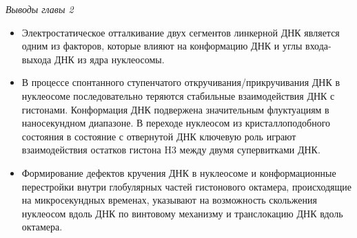 \textit{Выводы главы 2} \newline

 
\begin{itemize}
    \item Электростатическое отталкивание двух сегментов линкерной ДНК является одним из факторов, которые влияют на конформацию ДНК и углы входа-выхода ДНК из ядра нуклеосомы.
    \item В процессе спонтанного ступенчатого откручивания/прикручивания ДНК в нуклеосоме последовательно теряются стабильные взаимодействия ДНК с гистонами. Конформация ДНК подвержена значительным флуктуациям в наносекундном диапазоне. В переходе нуклеосом из кристаллоподобного состояния в состояние с отвернутой ДНК ключевую роль играют взаимодействия остатков гистона H3 между двумя супервитками ДНК.
    \item Формирование дефектов кручения ДНК в нуклеосоме и конформационные перестройки внутри глобулярных частей гистонового октамера, происходящие на микросекундных временах, указывают на возможность скольжения нуклеосом вдоль ДНК по винтовому механизму и транслокацию ДНК вдоль октамера.
\end{itemize}


